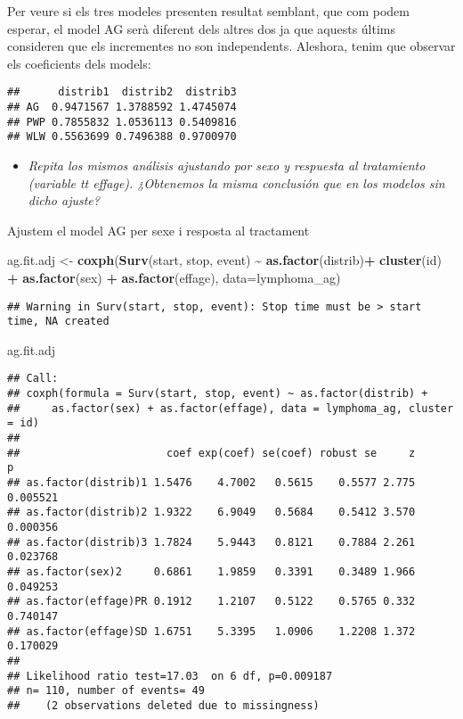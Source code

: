 \documentclass[
]{article}
\newenvironment{Shaded}{\begin{snugshade}}{\end{snugshade}}
\newcommand{\AttributeTok}[1]{\textcolor[rgb]{0.13,0.29,0.53}{#1}}
\newcommand{\FunctionTok}[1]{\textcolor[rgb]{0.13,0.29,0.53}{\textbf{#1}}}
\newcommand{\NormalTok}[1]{#1}
\newcommand{\OtherTok}[1]{\textcolor[rgb]{0.56,0.35,0.01}{#1}}
\newcommand{\SpecialCharTok}[1]{\textcolor[rgb]{0.81,0.36,0.00}{\textbf{#1}}}
\providecommand{\tightlist}{%
  \setlength{\itemsep}{0pt}\setlength{\parskip}{0pt}}
\begin{document}
Per veure si els tres modeles presenten resultat semblant, que com podem
esperar, el model AG serà diferent dels altres dos ja que aquests últims
consideren que els incrementes no son independents. Aleshora, tenim que
observar els coeficients dels models:

\begin{verbatim}
##      distrib1  distrib2  distrib3
## AG  0.9471567 1.3788592 1.4745074
## PWP 0.7855832 1.0536113 0.5409816
## WLW 0.5563699 0.7496388 0.9700970
\end{verbatim}

\begin{itemize}
\tightlist
\item
  \emph{Repita los mismos análisis ajustando por sexo y respuesta al
  tratamiento (variable tt effage). ¿Obtenemos la misma conclusión que
  en los modelos sin dicho ajuste?}
\end{itemize}

Ajustem el model AG per sexe i resposta al tractament

\begin{Shaded}
\begin{Highlighting}[]
\NormalTok{ag.fit.adj }\OtherTok{\textless{}{-}} \FunctionTok{coxph}\NormalTok{(}\FunctionTok{Surv}\NormalTok{(start, stop, event) }\SpecialCharTok{\textasciitilde{}} \FunctionTok{as.factor}\NormalTok{(distrib)}\SpecialCharTok{+}
                  \FunctionTok{cluster}\NormalTok{(id) }\SpecialCharTok{+} \FunctionTok{as.factor}\NormalTok{(sex) }\SpecialCharTok{+} \FunctionTok{as.factor}\NormalTok{(effage), }\AttributeTok{data=}\NormalTok{lymphoma\_ag)}
\end{Highlighting}
\end{Shaded}

\begin{verbatim}
## Warning in Surv(start, stop, event): Stop time must be > start time, NA created
\end{verbatim}

\begin{Shaded}
\begin{Highlighting}[]
\NormalTok{ag.fit.adj}
\end{Highlighting}
\end{Shaded}

\begin{verbatim}
## Call:
## coxph(formula = Surv(start, stop, event) ~ as.factor(distrib) + 
##     as.factor(sex) + as.factor(effage), data = lymphoma_ag, cluster = id)
## 
##                       coef exp(coef) se(coef) robust se     z        p
## as.factor(distrib)1 1.5476    4.7002   0.5615    0.5577 2.775 0.005521
## as.factor(distrib)2 1.9322    6.9049   0.5684    0.5412 3.570 0.000356
## as.factor(distrib)3 1.7824    5.9443   0.8121    0.7884 2.261 0.023768
## as.factor(sex)2     0.6861    1.9859   0.3391    0.3489 1.966 0.049253
## as.factor(effage)PR 0.1912    1.2107   0.5122    0.5765 0.332 0.740147
## as.factor(effage)SD 1.6751    5.3395   1.0906    1.2208 1.372 0.170029
## 
## Likelihood ratio test=17.03  on 6 df, p=0.009187
## n= 110, number of events= 49 
##    (2 observations deleted due to missingness)
\end{verbatim}
\end{document}
